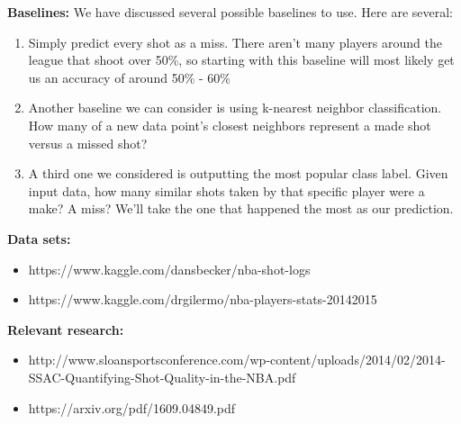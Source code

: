 \documentclass[12pt]{article}
\begin{document}
\textbf{Baselines:} We have discussed several possible baselines to use. Here are several: 
\begin{enumerate}
\item Simply predict every shot as a miss. There aren't many players around the league that shoot over 50\%, so starting with this baseline will most likely get us an accuracy of around 50\% - 60\%

\item Another baseline we can consider is using k-nearest neighbor classification. How many of a new data point's closest neighbors represent a made shot versus a missed shot? 

\item A third one we considered is outputting the most popular class label. Given input data, how many similar shots taken by that specific player were a make? A miss? We'll take the one that happened the most as our prediction.
\end{enumerate}

\textbf{Data sets:} 
\begin{itemize}
\item https://www.kaggle.com/dansbecker/nba-shot-logs
\item https://www.kaggle.com/drgilermo/nba-players-stats-20142015
\end{itemize}

\textbf{Relevant research:} 
\begin{itemize}
\item http://www.sloansportsconference.com/wp-content/uploads/2014/02/2014-SSAC-Quantifying-Shot-Quality-in-the-NBA.pdf
\item https://arxiv.org/pdf/1609.04849.pdf
\end{itemize}

\end{document}
